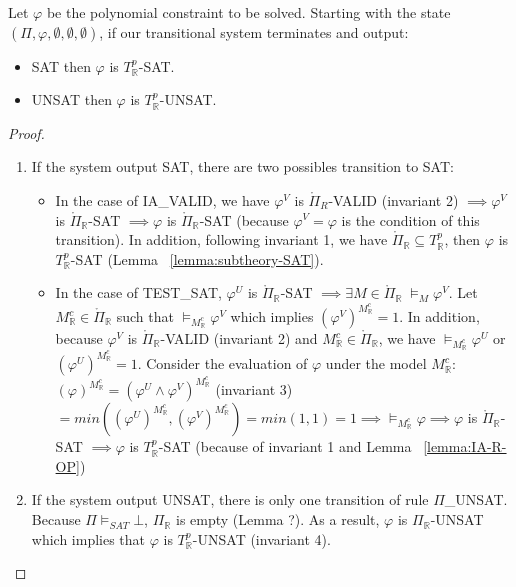 \begin{theorem}
Let $\varphi$ be the polynomial constraint to be solved. Starting with the state $(\Pi, \varphi, \emptyset, \emptyset, \emptyset)$, if our transitional system terminates and output:
\begin{itemize}
\item SAT then $\varphi$ is $T^p_\mathbb{R}$-SAT.
\item UNSAT then $\varphi$ is $T^p_\mathbb{R}$-UNSAT.
\end{itemize}
\end{theorem}

\begin{proof}
\begin{enumerate}
\item If the system output SAT, there are two possibles transition to SAT:
\begin{itemize}
\item In the case of IA\_VALID, we have $\varphi^V$ is $\mathring{\Pi}_{R}$-VALID (invariant 2) $\implies \varphi^V$ is $\mathring{\Pi}_\mathbb{R}$-SAT $\implies \varphi$ is $\mathring{\Pi}_\mathbb{R}$-SAT (because $\varphi^V = \varphi$ is the condition of this transition). In addition, following invariant 1, we have $\mathring{\Pi}_\mathbb{R} \subseteq T^p_\mathbb{R}$, then $\varphi$ is $T^p_\mathbb{R}$-SAT (Lemma ~\ref{lemma:subtheory-SAT}).
\item \sloppy In the case of TEST\_SAT, $\varphi^U$ is $\mathring{\Pi}_\mathbb{R}$-SAT $\implies \exists M \in \mathring{\Pi}_\mathbb{R} \; \models_M \varphi^V$. Let ${M^c_\mathbb{R} \in \mathring{\Pi}_\mathbb{R}}$ such that $\models_{M^c_\mathbb{R}} \varphi^V$ which implies $(\varphi^V)^{M^c_\mathbb{R}} = 1$. In addition, because $\varphi^V$ is $\mathring{\Pi}_\mathbb{R}$-VALID (invariant 2) and $M^c_\mathbb{R} \in \mathring{\Pi}_\mathbb{R}$, we have $\models_{M^c_\mathbb{R}} \varphi^U$ or ${(\varphi^U)^{M^c_\mathbb{R}} = 1}$. Consider the evaluation of $\varphi$ under the model $M^c_\mathbb{R}$: ${(\varphi)^{M^c_\mathbb{R}} = (\varphi^U \wedge \varphi^V)^{M^c_\mathbb{R}}}$ (invariant 3) $= min((\varphi^U)^{M^c_\mathbb{R}}, (\varphi^V)^{M^c_\mathbb{R}}) = min(1, 1) = 1 \implies \models_{M^c_\mathbb{R}} \varphi \implies \varphi$ is $\mathring{\Pi}_\mathbb{R}$-SAT $\implies \varphi$ is $T^p_\mathbb{R}$-SAT (because of invariant 1 and Lemma ~\ref{lemma:IA-R-OP})
\end{itemize}
\item  If the system output UNSAT, there is only one transition of rule $\Pi$\_UNSAT. Because $\Pi \models_{SAT} \bot$, $\Pi_\mathbb{R}$ is empty (Lemma ?). As a result, $\varphi$ is $\Pi_\mathbb{R}$-UNSAT which implies that $\varphi$ is $T^p_\mathbb{R}$-UNSAT (invariant 4).
\end{enumerate}
\end{proof}

